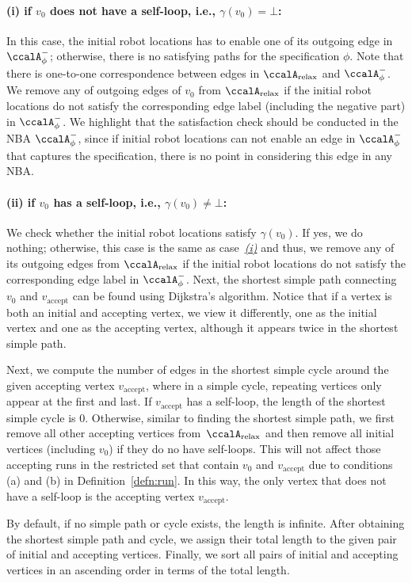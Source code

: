 \documentclass[Afour,sageh,times]{sagej}
\newcommand{\auto}[1]{\ccalA_{\text{#1}}}
\newcommand{\autop}{\ccalA_{\phi}}
\newcommand{\vertex}[1]{v_{\text{#1}}}
\begin{document}
{\paragraph{(i) if $v_0$ does not have a self-loop, i.e., $\gamma(v_0)=\bot$:}\label{sec:initial} In this case,  the initial robot locations has to enable one of its outgoing edge in $\autop^-$; otherwise, there is no satisfying paths for the specification $\phi$. Note that there is one-to-one correspondence between edges in $\auto{relax}$ and $\autop^-$. We remove any of outgoing edges of $v_0$ from $\auto{relax}$ if the initial robot locations do not satisfy the corresponding edge label (including the negative part) in $\autop^-$. We highlight that the satisfaction check should be conducted in the NBA $\autop^-$, since if initial robot locations can not enable an edge in $\autop^-$ that captures the specification, there is no point in considering this edge in any NBA.

  \paragraph{(ii) if $v_0$ has a self-loop, i.e., $\gamma(v_0)\neq\bot$:} We check whether the initial robot locations satisfy $\gamma(v_0)$. If yes, we do nothing; otherwise, this case is the  same as case~\hyperref[sec:initial]{\it (i)} and thus, we remove any of its  outgoing edges  from $\auto{relax}$ if the initial robot locations do not satisfy the corresponding edge label in $\autop^-$. Next, the shortest simple path connecting $v_0$ and $v_{\text{accept}}$ can be found using Dijkstra's algorithm.  Notice that if a vertex is both an initial and accepting vertex, we view it differently, one as the initial vertex and one as the accepting vertex, although it appears twice in the shortest simple path.

  Next, we compute the number of edges in the shortest simple cycle around the given accepting vertex $v_\text{accept}$, where in a simple cycle, repeating vertices only appear at the first and last. If $\vertex{accept}$ has a self-loop, the length of the shortest simple cycle is 0. Otherwise, similar to finding the shortest simple path, we first remove all other accepting vertices from~$\auto{relax}$ and then remove all initial vertices (including $v_0$) if they do no have self-loops. This will not affect those accepting runs in the restricted set that contain $v_0$ and $v_{\text{accept}}$  due to conditions (a) and (b) in Definition~\ref{defn:run}.
  In this way, the only vertex that does not have a self-loop is the accepting vertex $v_{\text{accept}}$.

  By default, if no simple path or cycle exists, the length is infinite. After obtaining the shortest simple path and cycle, we assign their total length to the given pair of initial and accepting vertices.  Finally,  we sort all pairs of initial and accepting vertices in an ascending order in terms of the total length.}
\end{document}

